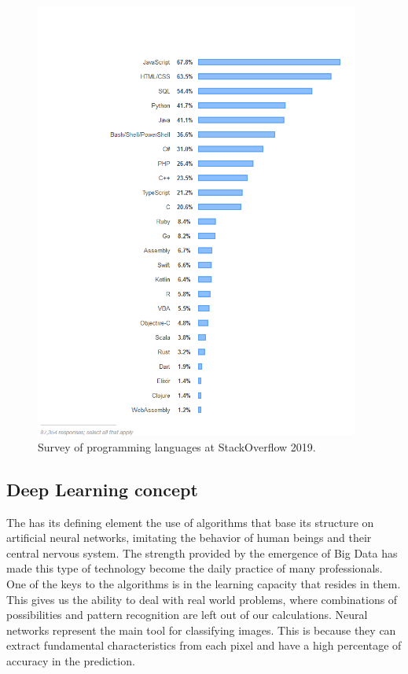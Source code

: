 \begin{figure}
    \centering
    \includegraphics[width=0.95\textwidth]{images/chapter1/stackoverflow_language.png}
    \caption{Survey of programming languages at StackOverflow 2019.}
    \label{fig:Encuesta sobre lenguajes de programación en StackOverflow 2019}
\end{figure}

\subsection{Deep Learning concept}\label{subsec:concepto-deep-learning}

The  has its defining element the use of algorithms that base its structure on artificial neural networks, imitating the behavior of human beings and their central nervous system.
The strength provided by the emergence of Big Data has made this type of technology become the daily practice of many professionals.
One of the keys to the  algorithms is in the learning capacity that resides in them.
This gives us the ability to deal with real world problems,
where combinations of possibilities and pattern recognition are left out of our calculations.
Neural networks represent the main tool for classifying images. This is because they can extract fundamental characteristics from each pixel and have a high percentage of accuracy in the prediction.




